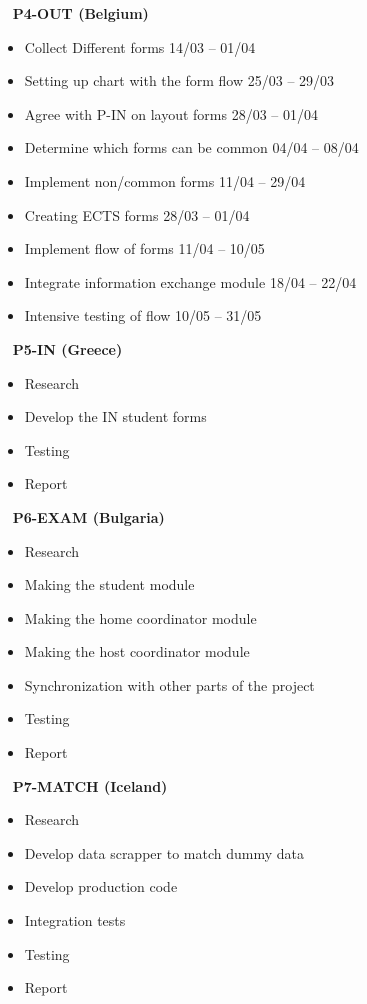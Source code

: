 \ \newline
\textbf{P4-OUT (Belgium)} 
\begin{itemize}
\item Collect Different forms	\hfill14/03 – 01/04
\item Setting up chart with the form flow	\hfill25/03 – 29/03
\item Agree with P-IN on layout forms		\hfill28/03 – 01/04
\item Determine which forms can be common		\hfill04/04 – 08/04
\item Implement non/common forms		\hfill11/04 – 29/04
\item Creating ECTS forms		\hfill28/03 – 01/04
\item Implement flow of forms		\hfill11/04 – 10/05
\item Integrate information  exchange module		\hfill18/04 – 22/04
\item Intensive testing of flow		\hfill10/05 – 31/05
\end{itemize}


\ \newline
\textbf{P5-IN (Greece)} 
\begin{itemize}
\item Research 
\item Develop the IN student forms
\item Testing
\item Report
\end{itemize}

\ \newline
\textbf{P6-EXAM (Bulgaria)} 
\begin{itemize}
\item Research
\item Making the student module
\item Making the home coordinator module
\item Making the host coordinator module
\item Synchronization with other parts of the project
\item Testing
\item Report
\end{itemize}

\ \newline
\textbf{P7-MATCH (Iceland)} 
\begin{itemize}
\item Research
\item Develop data scrapper to match dummy data
\item Develop production code
\item Integration tests
\item Testing
\item Report
\end{itemize}

